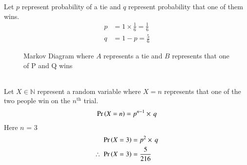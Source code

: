 
Let $p$ represent probability of a tie and $q$ represent probability that one of them wins. 
\begin{align}
    p &= 1\times\frac{1}{6} = \frac{1}{6}\\
    q &= 1-p = \frac{5}{6}
\end{align}
\vspace{-5mm}
\begin{figure}[h]
    \centering
    \par{Markov Diagram where $A$ represents a tie and $B$ represents that one of P and Q wins}
\end{figure}\vspace{3mm}\\
Let $X \in \mathbb{N}$ represent a random variable where $X = n$ represents that one of the two people win on the $n^{\text{th}}$ trial.
\begin{align}
    \Pr\left(X=n\right) = p^{n-1}\times\, q
\end{align}
Here $n$ = 3
\begin{align}
    \Pr\left(X=3\right) &= p^2\times\,q\\
    \therefore \;\Pr\left(X=3\right) &= \frac{5}{216}
\end{align}